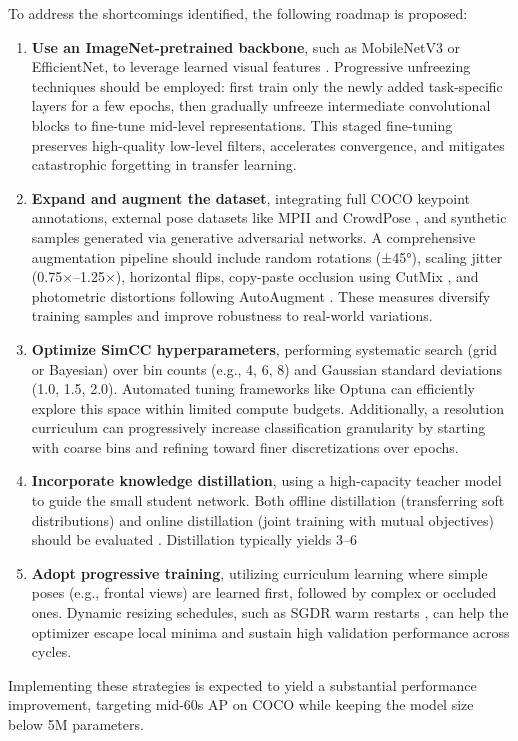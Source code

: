 To address the shortcomings identified, the following roadmap is proposed:

\begin{enumerate}
  \item \textbf{Use an ImageNet-pretrained backbone}, such as MobileNetV3 or EfficientNet, to leverage learned visual features \cite{Howard2017}. Progressive unfreezing techniques should be employed: first train only the newly added task-specific layers for a few epochs, then gradually unfreeze intermediate convolutional blocks to fine-tune mid-level representations. This staged fine-tuning preserves high-quality low-level filters, accelerates convergence, and mitigates catastrophic forgetting in transfer learning.
  \item \textbf{Expand and augment the dataset}, integrating full COCO keypoint annotations, external pose datasets like MPII \cite{Andriluka2014MPII} and CrowdPose \cite{Li2019CrowdPose}, and synthetic samples generated via generative adversarial networks. A comprehensive augmentation pipeline should include random rotations (±45°), scaling jitter (0.75×–1.25×), horizontal flips, copy-paste occlusion using CutMix \cite{Yun2019CutMix}, and photometric distortions following AutoAugment \cite{Cubuk2019AutoAugment}. These measures diversify training samples and improve robustness to real-world variations.
  \item \textbf{Optimize SimCC hyperparameters}, performing systematic search (grid or Bayesian) over bin counts (e.g., 4, 6, 8) and Gaussian standard deviations (1.0, 1.5, 2.0). Automated tuning frameworks like Optuna can efficiently explore this space within limited compute budgets. Additionally, a resolution curriculum can progressively increase classification granularity by starting with coarse bins and refining toward finer discretizations over epochs.
  \item \textbf{Incorporate knowledge distillation}, using a high-capacity teacher model to guide the small student network. Both offline distillation (transferring soft distributions) and online distillation (joint training with mutual objectives) should be evaluated \cite{Hinton2015Distill,Li2021OKD}. Distillation typically yields 3–6%
  \item \textbf{Adopt progressive training}, utilizing curriculum learning \cite{Bengio2009Curriculum} where simple poses (e.g., frontal views) are learned first, followed by complex or occluded ones. Dynamic resizing schedules, such as SGDR warm restarts \cite{Loshchilov2016SGDR}, can help the optimizer escape local minima and sustain high validation performance across cycles.
\end{enumerate}

Implementing these strategies is expected to yield a substantial performance improvement, targeting mid-60s AP on COCO while keeping the model size below 5M parameters.
